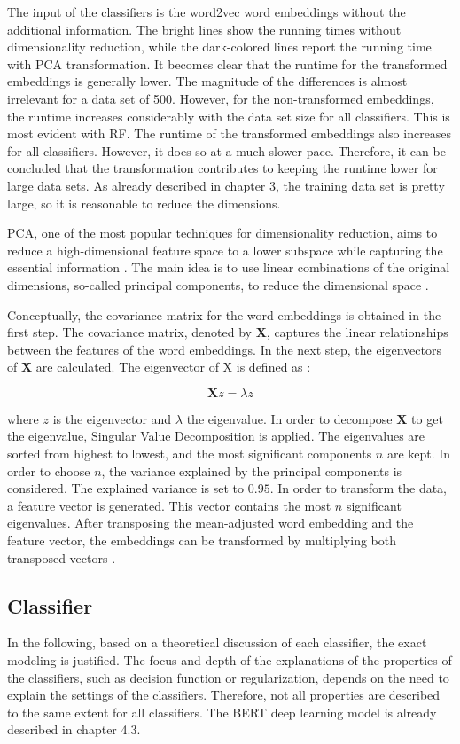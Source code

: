 \documentclass[12pt, a4paper, titlepage]{article}
\begin{document}
The input of the classifiers is the word2vec word embeddings without the additional information. The bright lines show the running times without dimensionality reduction, while the dark-colored lines report the running time with \ac{PCA} transformation. It becomes clear that the runtime for the transformed embeddings is generally lower. The magnitude of the differences is almost irrelevant for a data set of 500. However, for the non-transformed embeddings, the runtime increases considerably with the data set size for all classifiers. This is most evident with \ac{RF}. The runtime of the transformed embeddings also increases for all classifiers. However, it does so at a much slower pace. Therefore, it can be concluded that the transformation contributes to keeping the runtime lower for large data sets. As already described in chapter 3, the training data set is pretty large, so it is reasonable to reduce the dimensions. 

\ac{PCA}, one of the most popular techniques for dimensionality reduction, aims to reduce a high-dimensional feature space to a lower subspace while capturing the essential information \citep{tipping1999, bisong2019}. The main idea is to use linear combinations of the original dimensions, so-called principal components, to reduce the dimensional space \citep{bro2014,geladi2017}.

Conceptually, the covariance matrix for the word embeddings is obtained in the first step. The covariance matrix, denoted by $\textbf{X}$, captures the linear relationships between the features of the word embeddings. In the next step, the eigenvectors of $\textbf{X}$ are calculated. The eigenvector of X is defined as \citep{bro2014}: 

\[ \textbf{X}z = \lambda z \]

where $z$ is the eigenvector and $\lambda$ the eigenvalue. In order to decompose $\textbf{X}$ to get the eigenvalue, Singular Value Decomposition is applied. The eigenvalues are sorted from highest to lowest, and the most significant components $n$ are kept. In order to choose $n$, the variance explained by the principal components is considered. The explained variance is set to $0.95$. In order to transform the data, a feature vector is generated. This vector contains the most $n$ significant eigenvalues. After transposing the mean-adjusted word embedding and the feature vector, the embeddings can be transformed by multiplying both transposed vectors \citep{smith2002}. 

\subsection{Classifier}
In the following, based on a theoretical discussion of each classifier, the exact modeling is justified. The focus and depth of the explanations of the properties of the classifiers, such as decision function or regularization, depends on the need to explain the settings of the classifiers. Therefore, not all properties are described to the same extent for all classifiers. The \ac{BERT} deep learning model is already described in chapter 4.3. 
\end{document}
